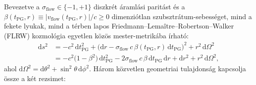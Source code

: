 \documentclass[11pt,a4paper]{article}
\theoremstyle{remark}
\begin{document}
Bevezetve a $\sigma_{\mathrm{flow}} \in \{-1, +1\}$ diszkr\'et \'araml\'asi parit\'ast \'es a $\beta(t_{\mathrm{PG}}, r) \equiv |v_{\mathrm{flow}}(t_{\mathrm{PG}}, r)|/c \ge 0$ dimenzi\'otlan szubsztr\'atum-sebess\'eget, mind a fekete lyukak, mind a t\'erben lapos Friedmann--Lema\^itre--Robertson--Walker (FLRW) kozmol\'ogia egyetlen k\"oz\"os mester-metrik\'aba \'irhat\'o:
\begin{align}
  \mathrm{d}s^2 &= -c^2\,\mathrm{d}t_{\mathrm{PG}}^2 + \bigl(\mathrm{d}r - \sigma_{\mathrm{flow}}\,c\,\beta(t_{\mathrm{PG}}, r)\,\mathrm{d}t_{\mathrm{PG}}\bigr)^2 + r^2\,\mathrm{d}\Omega^2 \nonumber\\
  &= -c^2\bigl(1 - \beta^2\bigr)\,\mathrm{d}t_{\mathrm{PG}}^2 - 2\sigma_{\mathrm{flow}}\,c\,\beta\,\mathrm{d}t_{\mathrm{PG}}\,\mathrm{d}r + \mathrm{d}r^2 + r^2\,\mathrm{d}\Omega^2,
  \label{eq:master_pg_metric}
\end{align}
ahol $\mathrm{d}\Omega^2 = \mathrm{d}\theta^2 + \sin^2\theta\,\mathrm{d}\phi^2$. H\'arom k\"ozvetlen geometriai tulajdons\'ag kapcsolja \"ossze a k\'et rezsimet:
\end{document}
